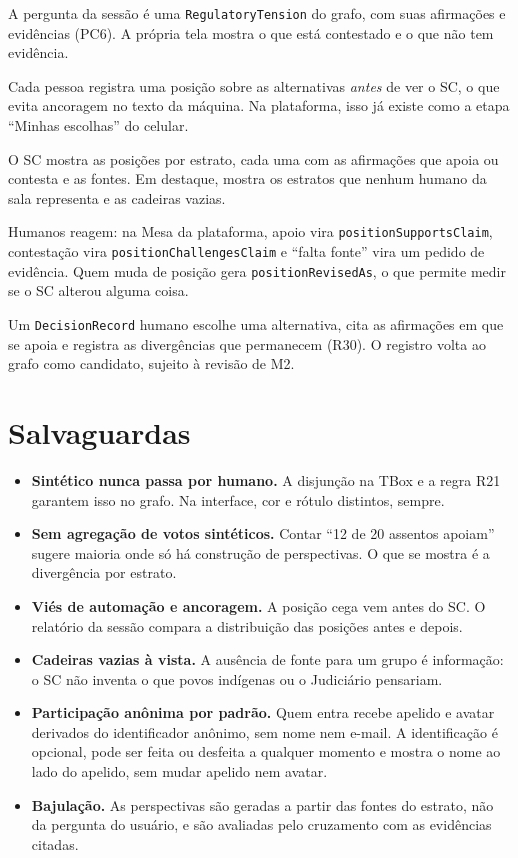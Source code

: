 \documentclass[12pt,a4paper,oneside,english,brazil]{abntex2}
\begin{document}
\begin{description}[leftmargin=*, style=nextline]
  \item[Rodada 0, enquadramento.] A pergunta da sessão é uma \texttt{RegulatoryTension} do grafo, com suas afirmações e evidências (PC6). A própria tela mostra o que está contestado e o que não tem evidência.
  \item[Rodada 1, posição cega.] Cada pessoa registra uma posição sobre as alternativas \emph{antes} de ver o SC, o que evita ancoragem no texto da máquina. Na plataforma, isso já existe como a etapa ``Minhas escolhas'' do celular.
  \item[Rodada 2, revelação.] O SC mostra as posições por estrato, cada uma com as afirmações que apoia ou contesta e as fontes. Em destaque, mostra os estratos que nenhum humano da sala representa e as cadeiras vazias.
  \item[Rodada 3, revisão.] Humanos reagem: na Mesa da plataforma, apoio vira \texttt{positionSupportsClaim}, contestação vira \texttt{positionChallengesClaim} e ``falta fonte'' vira um pedido de evidência. Quem muda de posição gera \texttt{positionRevisedAs}, o que permite medir se o SC alterou alguma coisa.
  \item[Rodada 4, decisão.] Um \texttt{DecisionRecord} humano escolhe uma alternativa, cita as afirmações em que se apoia e registra as divergências que permanecem (R30). O registro volta ao grafo como candidato, sujeito à revisão de M2.
\end{description}

\section{Salvaguardas}
\begin{itemize}[leftmargin=*]
  \item \textbf{Sintético nunca passa por humano.} A disjunção na TBox e a regra R21 garantem isso no grafo. Na interface, cor e rótulo distintos, sempre.
  \item \textbf{Sem agregação de votos sintéticos.} Contar ``12 de 20 assentos apoiam'' sugere maioria onde só há construção de perspectivas. O que se mostra é a divergência por estrato.
  \item \textbf{Viés de automação e ancoragem.} A posição cega vem antes do SC. O relatório da sessão compara a distribuição das posições antes e depois.
  \item \textbf{Cadeiras vazias à vista.} A ausência de fonte para um grupo é informação: o SC não inventa o que povos indígenas ou o Judiciário pensariam.
  \item \textbf{Participação anônima por padrão.} Quem entra recebe apelido e avatar derivados do identificador anônimo, sem nome nem e-mail. A identificação é opcional, pode ser feita ou desfeita a qualquer momento e mostra o nome ao lado do apelido, sem mudar apelido nem avatar.
  \item \textbf{Bajulação.} As perspectivas são geradas a partir das fontes do estrato, não da pergunta do usuário, e são avaliadas pelo cruzamento com as evidências citadas.
\end{itemize}
\end{document}
